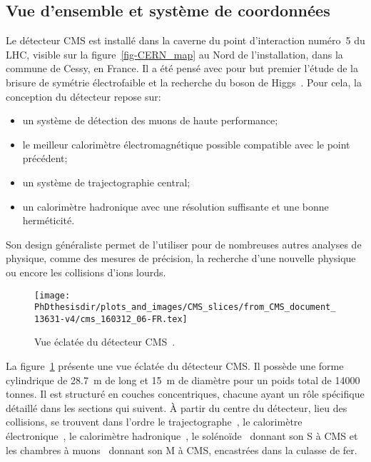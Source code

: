 \subsection{Vue d'ensemble et système de coordonnées}\label{chapter-LHC-section-CMS-subsec-overview_and_coordinates}
Le détecteur CMS est installé dans la caverne du point d'interaction numéro~5 du LHC, visible sur la figure~\ref{fig-CERN_map} au Nord de l'installation, dans la commune de Cessy, en France.
Il a été pensé avec pour but premier l'étude de la brisure de symétrie électrofaible et la recherche du boson de Higgs~\cite{cms_letter_intent}.
Pour cela, la conception du détecteur repose sur:
\begin{itemize}
\item un système de détection des muons de haute performance;
\item le meilleur calorimètre électromagnétique possible compatible avec le point précédent;
\item un système de trajectographie central;
\item un calorimètre hadronique avec une résolution suffisante et une bonne herméticité.
\end{itemize}
Son design généraliste permet de l'utiliser pour de nombreuses autres analyses de physique, comme des mesures de précision, la recherche d'une nouvelle physique ou encore les collisions d'ions lourds.
\begin{figure}[b]
\centering
\texttt{[image: \\PhDthesisdir/plots\_and\_images/CMS\_slices/from\_CMS\_document\_13631-v4/cms\_160312\_06-FR.tex]}
\caption[Vue éclatée du détecteur CMS.]{Vue éclatée du détecteur CMS~\cite{CMS_document_13631-v4}.}
\label{fig-chapter-LHC-section-CMS-subsec-overview_and_coordinates-vue_eclatee_CMS}
\end{figure}
\par La figure~\ref{fig-chapter-LHC-section-CMS-subsec-overview_and_coordinates-vue_eclatee_CMS} présente une vue éclatée du détecteur CMS.
Il possède une forme cylindrique de \SI{28.7}{\meter} de long et \SI{15}{\meter} de diamètre pour un poids total de \num{14000} tonnes.
Il est structuré en couches concentriques, chacune ayant un rôle spécifique détaillé dans les sections qui suivent.
À partir du centre du détecteur, lieu des collisions, se trouvent dans l'ordre
le trajectographe~\cite{CERN-LHCC-98-006},
le calorimètre électronique~\cite{CERN-LHCC-97-033},
le calorimètre hadronique~\cite{CERN-LHCC-97-031},
le solénoïde~\cite{CERN-LHCC-97-010} donnant son \og S \fg{} à CMS et
les chambres à muons~\cite{CERN-LHCC-97-032} donnant son \og M \fg{} à CMS, encastrées dans la culasse de fer.
